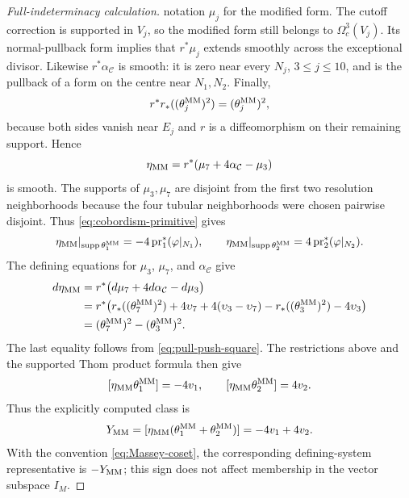 \documentclass[11pt]{article}
\theoremstyle{remark}\newtheorem{remark}[theorem]{Remark}
\begin{document}
\begin{proof}[Full-indeterminacy calculation]
notation $\mu_j$ for the modified form.  The cutoff correction is supported
in $V_j$, so the modified form still belongs to $\Omega_c^3(V_j)$.  Its
normal-pullback form implies
that $r^*\mu_j$ extends smoothly across the exceptional divisor.  Likewise
$r^*\alpha_{\mathcal C}$ is smooth:
it is zero near every $N_j$, $3\le j\le10$, and is the pullback of a form
on the centre near $N_1,N_2$.  Finally,
\begin{equation}\label{eq:pull-push-square}
 r^*r_*((\theta_j^{\rm MM})^2)=(\theta_j^{\rm MM})^2,
\end{equation}
because both sides vanish near $E_j$ and $r$ is a diffeomorphism on their
remaining support.  Hence
\begin{equation}\label{eq:etaMM-construction}
 \eta_{\rm MM}=r^*(\mu_7+4\alpha_{\mathcal C}-\mu_3)
\end{equation}
is smooth.  The supports of $\mu_3,\mu_7$ are disjoint from the first two
resolution neighborhoods because the four tubular neighborhoods were
chosen pairwise disjoint.  Thus \eqref{eq:cobordism-primitive} gives
\[
 \eta_{\rm MM}|_{\operatorname{supp}\theta_1^{\rm MM}}
 =-4\operatorname{pr}_1^*(\varphi|_{N_1}),\qquad
 \eta_{\rm MM}|_{\operatorname{supp}\theta_2^{\rm MM}}
 = 4\operatorname{pr}_2^*(\varphi|_{N_2}).
\]
The defining equations for $\mu_3$, $\mu_7$, and
$\alpha_{\mathcal C}$ give
\begin{align*}
d\eta_{\rm MM}
 &=r^*\bigl(d\mu_7+4d\alpha_{\mathcal C}-d\mu_3\bigr)\\
 &=r^*\bigl(r_*((\theta_7^{\rm MM})^2)+4\upsilon_7
       +4(\upsilon_3-\upsilon_7)
       -r_*((\theta_3^{\rm MM})^2)-4\upsilon_3\bigr)\\
 &=(\theta_7^{\rm MM})^2-(\theta_3^{\rm MM})^2.
\end{align*}
The last equality follows from \eqref{eq:pull-push-square}.
The restrictions above and the supported Thom product formula then give
\begin{equation}\label{eq:MM-primitive-data}
[\eta_{\rm MM}\theta_1^{\rm MM}]=-4v_1,\qquad
[\eta_{\rm MM}\theta_2^{\rm MM}]=4v_2.
\end{equation}
Thus the explicitly computed class is
\begin{equation}\label{eq:YMM}
Y_{\rm MM}
=[\eta_{\rm MM}(\theta_1^{\rm MM}+\theta_2^{\rm MM})]
=-4v_1+4v_2.
\end{equation}
With the convention \eqref{eq:Massey-coset}, the corresponding
defining-system representative is $-Y_{\rm MM}$; this sign does not affect
membership in the vector subspace $I_M$.

\end{proof}
\end{document}
